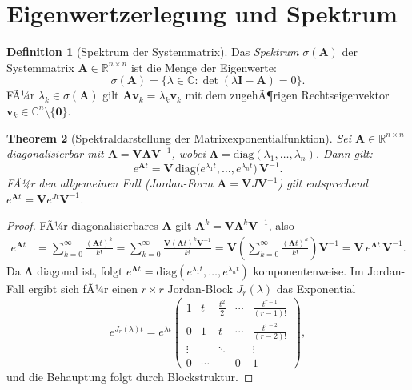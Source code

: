 ﻿\documentclass[12pt, a4paper, titlepage]{report}
\newtheorem{theorem}{Theorem}[section]
\theoremstyle{definition}
\newtheorem{definition}[theorem]{Definition}
\theoremstyle{remark}
\newcommand{\R}{\mathbb{R}}
\newcommand{\C}{\mathbb{C}}
\newcommand{\vA}{\bm{A}}
\newcommand{\vI}{\bm{I}}
\newcommand{\vV}{\bm{V}}
\newcommand{\vLambda}{\bm{\Lambda}}
\newcommand{\spec}{\sigma}
\newcommand{\diag}{\mathrm{diag}}
\begin{document}
\section{Eigenwertzerlegung und Spektrum}

\begin{definition}[Spektrum der Systemmatrix]
Das \emph{Spektrum} $\spec(\vA)$ der Systemmatrix $\vA \in \R^{n \times n}$ ist die
Menge der Eigenwerte:
\begin{equation}
  \spec(\vA) = \{\lambda \in \C : \det(\lambda\vI - \vA) = 0\}.
  \label{eq:spektrum}
\end{equation}
FÃ¼r $\lambda_k \in \spec(\vA)$ gilt $\vA\bm{v}_k = \lambda_k\bm{v}_k$ mit dem zugehÃ¶rigen
Rechtseigenvektor $\bm{v}_k \in \C^n \setminus \{\bm{0}\}$.
\end{definition}

\begin{theorem}[Spektraldarstellung der Matrixexponentialfunktion]
\label{thm:spektralexp}
Sei $\vA \in \R^{n \times n}$ diagonalisierbar mit $\vA = \vV\vLambda\vV^{-1}$,
wobei $\vLambda = \diag(\lambda_1, \ldots, \lambda_n)$. Dann gilt:
\begin{equation}
  e^{\vA t} = \vV\,\diag\!\bigl(e^{\lambda_1 t},\ldots,e^{\lambda_n t}\bigr)\,\vV^{-1}.
  \label{eq:spektralexp}
\end{equation}
FÃ¼r den allgemeinen Fall (Jordan-Form $\vA = \vV J \vV^{-1}$) gilt entsprechend
$e^{\vA t} = \vV e^{Jt} \vV^{-1}$.
\end{theorem}

\begin{proof}
FÃ¼r diagonalisierbares $\vA$ gilt $\vA^k = \vV\vLambda^k\vV^{-1}$, also
\begin{align*}
  e^{\vA t} &= \sum_{k=0}^\infty \frac{(\vA t)^k}{k!}
             = \sum_{k=0}^\infty \frac{\vV(\vLambda t)^k\vV^{-1}}{k!}
             = \vV\!\left(\sum_{k=0}^\infty \frac{(\vLambda t)^k}{k!}\right)\!\vV^{-1}
             = \vV\,e^{\vLambda t}\,\vV^{-1}.
\end{align*}
Da $\vLambda$ diagonal ist, folgt $e^{\vLambda t} = \diag(e^{\lambda_1 t}, \ldots, e^{\lambda_n t})$
komponentenweise. Im Jordan-Fall ergibt sich fÃ¼r einen $r \times r$ Jordan-Block
$J_r(\lambda)$ das Exponential
\[
  e^{J_r(\lambda)t} = e^{\lambda t}\begin{pmatrix}
    1 & t & \frac{t^2}{2} & \cdots & \frac{t^{r-1}}{(r-1)!} \\
    0 & 1 & t & \cdots & \frac{t^{r-2}}{(r-2)!} \\
    \vdots & & \ddots & & \vdots \\
    0 & \cdots & & 0 & 1
  \end{pmatrix},
\]
und die Behauptung folgt durch Blockstruktur. \qedhere
\end{proof}
\end{document}
